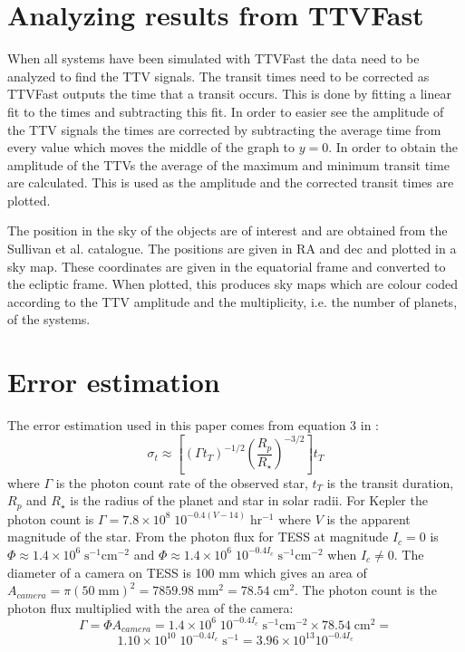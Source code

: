\documentclass[12pt]{report}
\begin{document}
\section{Analyzing results from TTVFast}
	When all systems have been simulated with TTVFast the data need to be analyzed to find the TTV signals. The transit times need to be corrected as TTVFast outputs the time that a transit occurs. This is done by fitting a linear fit to the times and subtracting this fit. In order to easier see the amplitude of the TTV signals the times are corrected by subtracting the average time from every value which moves the middle of the graph to $y=0$. In order to obtain the amplitude of the TTVs the average of the maximum and minimum transit time are calculated. This is used as the amplitude and the corrected transit times are plotted.
	
	The position in the sky of the objects are of interest and are obtained from the Sullivan et al. catalogue. The positions are given in RA and dec and plotted in a sky map. These coordinates are given in the equatorial frame and converted to the ecliptic frame. When plotted, this produces sky maps which are colour coded according to the TTV amplitude and the multiplicity, i.e. the number of planets, of the systems.
	

\section{Error estimation}
	The error estimation used in this paper comes from equation 3 in \cite{2005Sci...307.1288H}:
	\begin{equation}
		\sigma_t \approx \left[\left(\Gamma t_T\right)^{-1/2}  \left(\frac{R_p}{R_{\star}}\right)^{-3/2}\right] t_T
	\end{equation}
	where $\Gamma$ is the photon count rate of the observed star, $t_T$ is the transit duration, $R_p$ and $R_{\star}$ is the radius of the planet and star in solar radii. For Kepler the photon count is $\Gamma = 7.8 \times 10^8\; 10^{-0.4(V-14)} \; \mathrm{hr^{-1}}$ where $V$ is the apparent magnitude of the star. From \cite{2015ApJ...809...77S} the photon flux for TESS at magnitude $I_c=0$ is $\Phi \approx 1.4 \times 10^6 \; \mathrm{s^{-1} cm^{-2}}$ and $\Phi \approx 1.4 \times 10^6 \; 10^{-0.4I_c} \; \mathrm{s^{-1} cm^{-2}}$ when $I_c \neq 0$. The diameter of a camera on TESS is 100 mm which gives an area of $A_{camera} = \pi (50 \; \mathrm{mm})^2 = 7859.98 \; \mathrm{mm}^2 = 78.54 \; \mathrm{cm}^2$. The photon count is the photon flux multiplied with the area of the camera:
	\begin{equation}
		\Gamma = \Phi A_{camera} = 1.4 \times 10^6\; 10^{-0.4I_c} \; \mathrm{s^{-1} cm^{-2}} \times 78.54 \; \mathrm{cm}^2 = 
	\end{equation}
	\begin{equation}
	1.10 \times 10^{10}\; 10^{-0.4I_c} \; \mathrm{s}^{-1} = 3.96 \times 10^{13} 10^{-0.4I_c}
	\end{equation}
\end{document}
